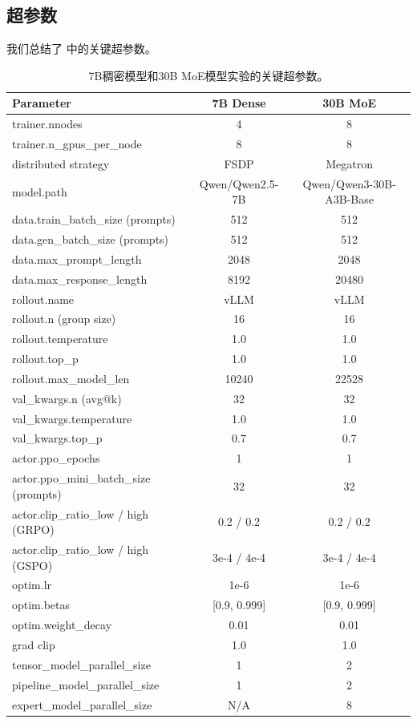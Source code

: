 \documentclass{article}
\theoremstyle{plain}
\theoremstyle{definition}
\theoremstyle{remark}
\begin{document}
\subsection{超参数}
我们总结了  中的关键超参数。 
\begin{table}[htb]
    \centering
    \caption{7B稠密模型和30B MoE模型实验的关键超参数。}
    \label{tab:hyperparams}
    \small
    \begin{tabular}{lcc}
        \toprule
        \textbf{Parameter} & \textbf{7B Dense} & \textbf{30B MoE} \\
        \midrule
        trainer.nnodes & 4 & 8 \\
        trainer.n\_gpus\_per\_node & 8 & 8 \\
        distributed strategy & FSDP & Megatron \\
        model.path & Qwen/Qwen2.5-7B & Qwen/Qwen3-30B-A3B-Base \\
        \midrule
        data.train\_batch\_size (prompts) & 512 & 512 \\
        data.gen\_batch\_size (prompts) & 512 & 512 \\
        data.max\_prompt\_length & 2048 & 2048 \\
        data.max\_response\_length & 8192 & 20480 \\
        \midrule
        rollout.name & vLLM & vLLM \\
        rollout.n (group size) & 16 & 16 \\
        rollout.temperature & 1.0 & 1.0 \\
        rollout.top\_p & 1.0 & 1.0 \\
        rollout.max\_model\_len & 10240 & 22528 \\
        val\_kwargs.n (avg@k) & 32 & 32 \\
        val\_kwargs.temperature & 1.0 & 1.0 \\
        val\_kwargs.top\_p & 0.7 & 0.7 \\
        \midrule
        actor.ppo\_epochs & 1 & 1 \\
        actor.ppo\_mini\_batch\_size (prompts) & 32 & 32 \\
        actor.clip\_ratio\_low / high (GRPO) & 0.2 / 0.2 & 0.2 / 0.2 \\
        actor.clip\_ratio\_low / high (GSPO) & 3e-4 / 4e-4 & 3e-4 / 4e-4 \\
        optim.lr & 1e-6 & 1e-6 \\
        optim.betas & [0.9, 0.999] & [0.9, 0.999] \\
        optim.weight\_decay & 0.01 & 0.01 \\
        grad clip & 1.0 & 1.0 \\
        \midrule
        tensor\_model\_parallel\_size & 1 & 2 \\
        pipeline\_model\_parallel\_size & 1 & 2 \\
        expert\_model\_parallel\_size & N/A & 8 \\
        \bottomrule
    \end{tabular}
\end{table}
\end{document}
